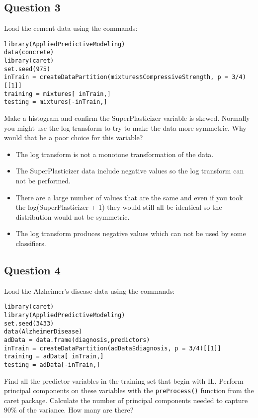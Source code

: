 \documentclass[DSS8main.tex]{subfiles}
\begin{document}
\subsection*{Question 3}
Load the cement data using the commands:
\begin{framed}
\begin{verbatim}
library(AppliedPredictiveModeling)
data(concrete)
library(caret)
set.seed(975)
inTrain = createDataPartition(mixtures$CompressiveStrength, p = 3/4)[[1]]
training = mixtures[ inTrain,]
testing = mixtures[-inTrain,]
\end{verbatim}
\end{framed}
Make a histogram and confirm the SuperPlasticizer variable is skewed. Normally you might use the log transform to try to make the data more symmetric. Why would that be a poor choice for this variable?
\begin{itemize}
\item The log transform is not a monotone transformation of the data.
\item The SuperPlasticizer data include negative values so the log transform can not be performed.
\item There are a large number of values that are the same and even if you took the log(SuperPlasticizer + 1) they would still all be identical so the distribution would not be symmetric.
\item The log transform produces negative values which can not be used by some classifiers.
\end{itemize}
\subsection*{Question 4}
Load the Alzheimer's disease data using the commands:
\begin{framed}
\begin{verbatim}
library(caret)
library(AppliedPredictiveModeling)
set.seed(3433)
data(AlzheimerDisease)
adData = data.frame(diagnosis,predictors)
inTrain = createDataPartition(adData$diagnosis, p = 3/4)[[1]]
training = adData[ inTrain,]
testing = adData[-inTrain,]
\end{verbatim}
\end{framed}
Find all the predictor variables in the training set that begin with IL. Perform principal components on these variables with the \texttt{preProcess()} function from the caret package. Calculate the number of principal components needed to capture 90\% of the variance. How many are there?
\end{document}
